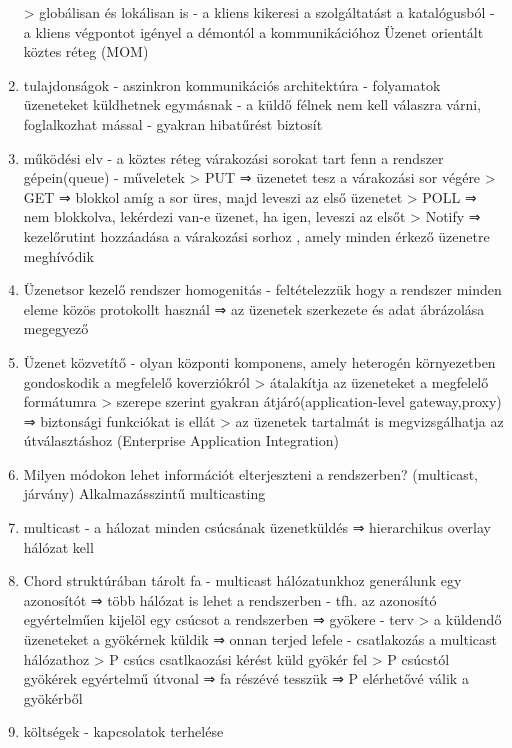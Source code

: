\documentclass[twoside, a4paper, 12pt]{article}
\begin{document}
\begin{enumerate}
        > globálisan és lokálisan is
        - a kliens kikeresi a szolgáltatást a katalógusból
        - a kliens végpontot igényel a démontól a kommunikációhoz
        Üzenet orientált köztes réteg (MOM)
    \item tulajdonságok
        - aszinkron kommunikációs architektúra
        - folyamatok üzeneteket küldhetnek egymásnak
        - a küldő félnek nem kell válaszra várni, foglalkozhat mással
        - gyakran hibatűrést biztosít
    \item működési elv
        - a köztes réteg várakozási sorokat tart fenn a rendszer gépein(queue)
        - műveletek
        > PUT    ⇒ üzenetet tesz a várakozási sor végére
        > GET    ⇒ blokkol amíg a sor üres, majd leveszi az első üzenetet
        > POLL 	 ⇒ nem blokkolva, lekérdezi van-e üzenet, ha igen, leveszi az elsőt
        > Notify ⇒	kezelőrutint hozzáadása a várakozási sorhoz , amely minden érkező üzenetre meghívódik
    \item Üzenetsor kezelő rendszer homogenitás
        - feltételezzük hogy a rendszer minden eleme közös protokollt használ
        ⇒ az üzenetek szerkezete és adat ábrázolása megegyező
    \item Üzenet közvetítő
        - olyan központi komponens, amely heterogén környezetben gondoskodik a megfelelő koverziókról
        > átalakítja az üzeneteket a megfelelő formátumra
        > szerepe szerint gyakran átjáró(application-level gateway,proxy) ⇒ biztonsági funkciókat is ellát
        > az üzenetek tartalmát is megvizsgálhatja az útválasztáshoz (Enterprise Application Integration)	
    \item  Milyen módokon lehet információt elterjeszteni a rendszerben? (multicast, járvány)
        Alkalmazásszintű multicasting
    \item multicast 
        - a hálozat minden csúcsának üzenetküldés
        ⇒ hierarchikus overlay hálózat kell
    \item Chord struktúrában tárolt fa
        - multicast hálózatunkhoz generálunk egy azonosítót ⇒ több hálózat is lehet a rendszerben
        - tfh. az azonosító egyértelműen kijelöl egy csúcsot a rendszerben ⇒ gyökere
        - terv
        > a küldendő üzeneteket a gyökérnek küldik ⇒ onnan terjed lefele
        - csatlakozás a multicast hálózathoz
        > P csúcs csatlkaozási kérést küld gyökér fel
        > P csúcstól gyökérek egyértelmű útvonal ⇒ fa részévé tesszük
        ⇒ P elérhetővé válik a gyökérből
    \item költségek
        - kapcsolatok terhelése

\end{enumerate}
\end{document}
